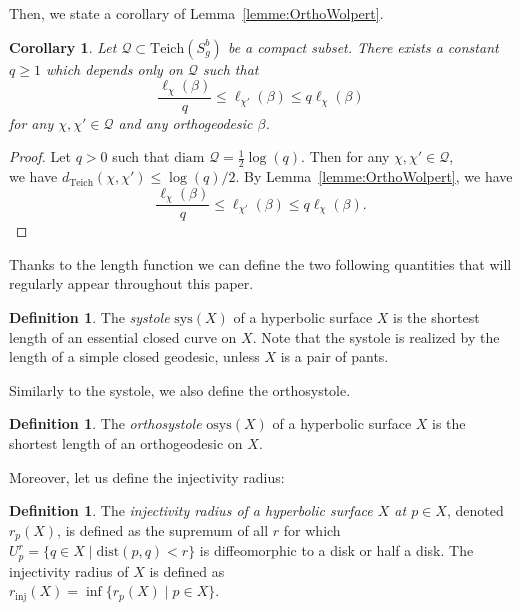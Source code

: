 \documentclass[a4paper,12pt]{article}
\newtheorem{corollaire}[theorem]{Corollary}
\theoremstyle{definition}
\newtheorem{definition}[theorem]{Definition}
\theoremstyle{remark}
\begin{document}

Then, we state a corollary of Lemma~\ref{lemme:OrthoWolpert}.

\begin{corollaire}\label{cor:Wolp}
    Let $\mathcal{Q} \subset \mathrm{Teich}(S_g^b)$ be a compact subset. There exists a constant $q \geqslant 1$ which depends only on $\mathcal{Q}$ such that
    \[
        \frac{\ell_{\chi} (\beta)}{q} \leqslant \ell_{\chi'}( \beta) \leqslant q \ell_{\chi} (\beta)
    \]
    for any $\chi, \chi' \in \mathcal{Q}$ and any orthogeodesic $\beta$.
\end{corollaire}

\begin{proof}
    Let $q>0$ such that $\text{diam } \mathcal{Q}= \frac{1}{2} \log(q)$. Then for any $\chi, \chi' \in \mathcal{Q}$, \\
    we have $d_{\mathrm{Teich}}(\chi,\chi') \leqslant \log(q)/2$. By Lemma~\ref{lemme:OrthoWolpert}, we have
    \[
        \frac{\ell_{\chi} (\beta)}{q}  \leqslant \ell_{\chi'} (\beta) \leqslant q \ell_{\chi} (\beta).
    \]
    
\end{proof}


Thanks to the length function we can define the two following quantities that will regularly appear throughout this paper.

\begin{definition}
    The \emph{systole} $\mathrm{sys}(X)$ of a hyperbolic surface $X$ is the shortest length of an essential closed curve on $X$. Note that the systole is realized by the length of a simple closed geodesic, unless $X$ is a pair of pants.
\end{definition}

Similarly to the systole, we also define the orthosystole.

\begin{definition}
    The \emph{orthosystole} $\mathrm{osys}(X)$ of a hyperbolic surface $X$ is the shortest length of an orthogeodesic on $X$.
\end{definition}

Moreover, let us define the injectivity radius:

\begin{definition}
    The \emph{injectivity radius of a hyperbolic surface $X$ at $p \in X$}, denoted $r_p(X)$, is defined as the supremum of all $r$ for which $U_p^r=\{ q \in X \mid \mbox{dist}(p,q) < r \}$ is diffeomorphic to a disk or half a disk. The injectivity radius of $X$ is defined as\\ $r_{\mbox{inj}}(X)=\inf\{ r_p(X) \mid p \in X \}$.
\end{definition}
\end{document}
